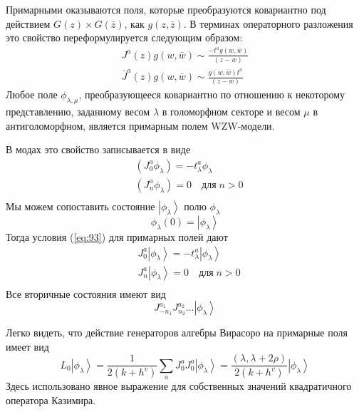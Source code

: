 \documentclass[a4paper,12pt]{article}
\theoremstyle{definition} \newtheorem{Def}{Definition}
\begin{document}
Примарными оказываются поля, которые преобразуются ковариантно под действием $G(z)\times G(\bar z)$,
как $g(z,\bar z)$. В терминах операторного разложения это свойство переформулируется следующим
образом:
\begin{equation}
  \label{eq:84}
  \begin{aligned}
    J^a(z)g(w,\bar w)\sim \frac{-t^a g(w,\bar w)}{(z-w)}\\
    \bar J^a(z)g(w,\bar w)\sim \frac{ g(w,\bar w)t^a}{(z-w)}
  \end{aligned}
\end{equation}
Любое поле $\phi_{\lambda,\mu}$, преобразующееся ковариантно по отношению к некоторому
представлению, заданному весом $\lambda$ в голоморфном секторе и весом $\mu$ в антиголоморфном,
является примарным полем WZW-модели.

В модах это свойство записывается в виде
\begin{equation}
  \label{eq:93}
  \begin{aligned}
    & (J_0^a \phi_{\lambda})=-t^a_{\lambda}\phi_{\lambda}\\
    & (J^a_n\phi_{\lambda})=0\quad \mbox{для}\; n>0\\
  \end{aligned}
\end{equation}
Мы можем сопоставить состояние $\left|\phi_{\lambda}\right>$ полю $\phi_{\lambda}$
  \begin{equation}
    \label{eq:94}
    \phi_{\lambda}(0)=\left|\phi_{\lambda}\right>
  \end{equation}
Тогда условия (\ref{eq:93}) для примарных полей дают
\begin{equation}
  \label{eq:95}
  \begin{aligned}
    & J_0^a\left|\phi_{\lambda}\right>=-t^a_{\lambda}\left|\phi_{\lambda}\right>\\
    & J^a_n\left|\phi_{\lambda}\right>=0 \quad \mbox{для}\; n>0 \\
  \end{aligned}
\end{equation}
Все вторичные состояния имеют вид
\begin{equation}
  \label{eq:97}
  J^{a_1}_{-n_1}J^{a_2}_{n_2}\dots\left|\phi_{\lambda}\right>
\end{equation}

Легко видеть, что действие генераторов алгебры Вирасоро на примарные поля имеет вид
\begin{equation}
  \label{eq:96}
  L_0\left|\phi_{\lambda}\right>=\frac{1}{2(k+h^v)}\sum_aJ^a_0J^a_0\left|\phi_{\lambda}\right>=\frac{(\lambda,\lambda+2\rho)}{2(k+h^v)}\left|\phi_{\lambda}\right>
\end{equation}
Здесь использовано явное выражение для собственных значений квадратичного оператора Казимира.
\end{document}
